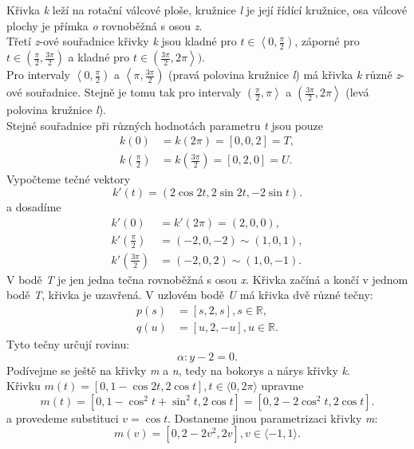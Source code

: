 Křivka \textit{k} leží na rotační válcové ploše, kružnice \textit{l} je její řídící kružnice, 
osa válcové plochy je přímka \textit{o} rovnoběžná s osou \textit{z}. \\
Třetí \textit{z}-ové souřadnice křivky \textit{k} jsou kladné pro $t \in \left\langle0, \frac{\pi}{2}\right)$,
záporné pro $t \in \left(\frac{\pi}{2}, \frac{3\pi}{2}\right)$ a kladné pro $t \in \left(\frac{3\pi}{2}, 2\pi\right\rangle)$.\\
Pro intervaly $\left\langle0, \frac{\pi}{2}\right)$ a $\left\langle\pi, \frac{3\pi}{2}\right)$ (pravá polovina kružnice \textit{l})
má křivka \textit{k} různě \textit{z}-ové souřadnice. Stejně je tomu tak pro intervaly $\left(\frac{\pi}{2}, \pi\right\rangle$ a
$\left(\frac{3\pi}{2}, 2\pi\right\rangle$ (levá polovina kružnice \textit{l}). \\
Stejné souřadnice při různých hodnotách parametru \textit{t} jsou pouze
\begin{align*}
	k(0)                        & = k(2\pi) = [0,0,2] = T,                      \\
	k\left(\frac{\pi}{2}\right) & = k\left(\frac{3\pi}{2}\right) = [0,2,0] = U. 
\end{align*}
Vypočteme tečné vektory
$$k'(t) = (2\cos{2t}, 2\sin{2t}, -2\sin{t}).$$
a dosadíme
\begin{align*}
	k'(0)                         & = k'(2\pi) = (2,0,0),     \\
	k'\left(\frac{\pi}{2}\right)  & = (-2,0,-2) \sim (1,0,1), \\
	k'\left(\frac{3\pi}{2}\right) & = (-2,0,2) \sim (1,0,-1). 
\end{align*}
V bodě \textit{T} je jen jedna tečna rovnoběžná s osou \textit{x}. Křivka začíná a končí v jednom bodě \textit{T},
křivka je uzavřená. V uzlovém bodě \textit{U} má křivka dvě různé tečny:
\begin{align*}
	p(s) & = [s,2,s], s \in \mathbb{R},  \\
	q(u) & = [u,2,-u], u \in \mathbb{R}. 
\end{align*}
Tyto tečny určují rovinu:
$$\alpha: y-2=0.$$
Podívejme se ještě na křivky \textit{m} a \textit{n}, tedy na bokorys a nárys křivky \textit{k}. \\
Křivku $m(t) = [0, 1 - \cos{2t}, 2\cos{t}], t \in \langle0, 2\pi\rangle$ upravme
$$m(t) = [0, 1 - \cos^2{t}+\sin^2{t}, 2\cos{t}] = [0, 2-2\cos^2{t}, 2\cos{t}].$$
a provedeme substituci $v=\cos{t}$. Dostaneme jinou parametrizaci křivky \textit{m}:
$$m(v) = [0, 2-2v^2, 2v], v \in \langle-1, 1\rangle.$$
